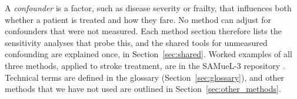 A \emph{confounder} is a factor, such as disease severity or frailty, that influences both whether a patient is treated and how they fare. No method can adjust for confounders that were not measured. Each method section therefore lists the sensitivity analyses that probe this, and the shared tools for unmeasured confounding are explained once, in Section~\ref{sec:shared}. Worked examples of all three methods, applied to stroke treatment, are in the SAMueL-3 repository \cite{samuel3}. Technical terms are defined in the glossary (Section~\ref{sec:glossary}), and other methods that we have not used are outlined in Section~\ref{sec:other_methods}.
